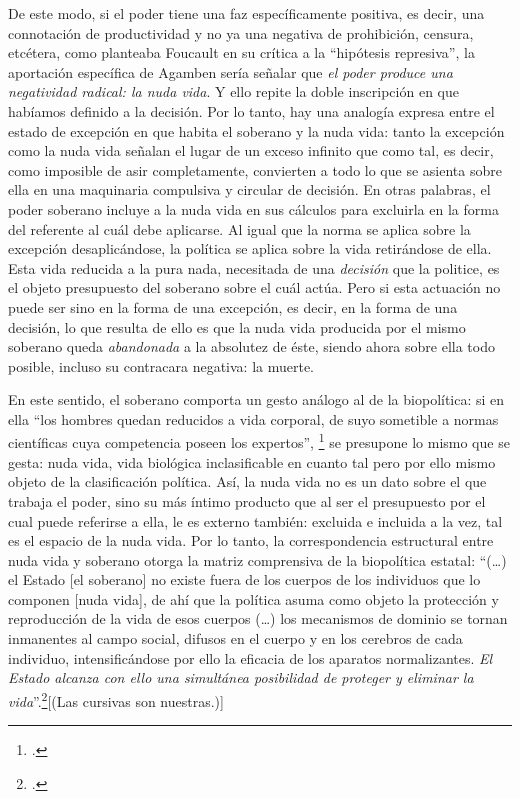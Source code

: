 De este modo, si el poder tiene una faz específicamente positiva, es decir, una connotación de productividad y no ya una negativa de prohibición, censura, etcétera, como planteaba Foucault en su crítica a la \enquote{hipótesis represiva}, la aportación específica de Agamben sería señalar que \emph{el poder produce una negatividad radical: la nuda vida}. Y ello repite la doble inscripción  en que habíamos definido a la decisión. Por lo tanto, hay una analogía expresa entre el estado de excepción en que habita el soberano y la nuda vida: tanto la excepción como la nuda vida señalan el lugar de un exceso infinito que como tal, es decir, como imposible de asir completamente, convierten a todo lo que se asienta sobre ella en una maquinaria compulsiva y circular de decisión. En otras palabras, el poder soberano incluye a la nuda vida en sus cálculos para excluirla en la forma del referente al cuál debe aplicarse. Al igual que la norma se aplica sobre la excepción desaplicándose, la política se aplica sobre la vida retirándose de ella. Esta vida reducida a la pura nada, necesitada de una \emph{decisión} que la politice, es el objeto presupuesto del soberano sobre el cuál actúa. Pero si esta actuación no puede ser sino en la forma de una excepción, es decir, en la forma de una decisión, lo que resulta de ello es que la nuda vida producida por el mismo soberano queda \emph{abandonada} a la absolutez de éste, siendo ahora sobre ella todo posible, incluso su contracara negativa: la muerte.

En este sentido, el soberano comporta un gesto análogo al de la biopolítica: si en ella \enquote{los hombres quedan reducidos a vida corporal, de suyo sometible a normas científicas cuya competencia poseen los expertos}, \footcite[91]{@7088-GALINDOHERVAS2003} se presupone lo mismo que se gesta: nuda vida, vida biológica inclasificable en cuanto tal pero por ello mismo objeto de la clasificación política. Así, la nuda vida no es un dato sobre el que trabaja el poder, sino su más íntimo producto que al ser el presupuesto por el cual puede referirse a ella, le es externo también: excluida e incluida a la vez, tal es el espacio de la nuda vida. Por lo tanto, la correspondencia estructural entre nuda vida y soberano otorga la matriz comprensiva de la biopolítica estatal: \enquote{(\ldots) el Estado {[}el soberano{]} no existe fuera de los cuerpos de los individuos que lo componen {[}nuda vida{]}, de ahí que la política asuma como objeto la protección y reproducción de la vida de esos cuerpos (\ldots) los mecanismos de dominio se tornan inmanentes al campo social, difusos en el cuerpo y en los cerebros de cada individuo, intensificándose por ello la eficacia de los aparatos normalizantes. \emph{El Estado alcanza con ello una simultánea posibilidad de proteger y eliminar la vida}}.\footcite[94-95]{@7088-GALINDOHERVAS2003}[(Las cursivas son nuestras.)]

